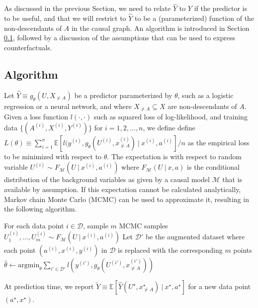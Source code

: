 
As discussed in the previous Section, we need to relate $\hat Y$ to
$Y$ if the predictor is to be useful, and that we will restrict to
$\hat Y$ to be a (parameterized) function of the non-descendants of
$A$ in the causal graph. An algorithm is introduced in Section
\ref{sec:algorithm}, followed by a discussion of the assumptions that
can be used to express counterfactuals.

\subsection{Algorithm}
\label{sec:algorithm}

Let $\hat Y \equiv g_\theta(U, X_{\nsucc A})$ be a predictor
parameterized by $\theta$, such as a logistic regression or a neural
network, and where $X_{\nsucc A} \subseteq X$ are non-descendants of
$A$. Given a loss function $l(\cdot, \cdot)$ such as squared loss of
log-likelihood, and training data $\{(A^{(i)}, X^{(i)}, Y^{(i)})\}$
for $i = 1, 2, \dots, n$, we define define $L(\theta) \equiv \sum_{i =
  1}^n \mathbb E[l(y^{(i)}, g_\theta(U^{(i)}, x^{(i)}_{\nsucc
    A})\ |\ x^{(i)}, a^{(i)}] / n$ as the empirical loss to be
minimized with respect to $\theta$.  The expectation is with respect
to random variable $U^{(i)} \sim F_{\mathcal M}(U\ |\ x^{(i)},
a^{(i)})$ where $F_{\mathcal M}(U\ |\ x, a)$ is the conditional
distribution of the background variables as given by a causal model
$\mathcal M$ that is available by assumption. If this expectation
cannot be calculated analytically, Markov chain Monte Carlo (MCMC) can
be used to approximate it, resulting in the following algorithm.
  
\begin{algorithmic}[1]
  \State For each data point $i \in \mathcal D$, sample $m$ MCMC samples
  $U_1^{(i)}, \dots, U_m^{(i)} \sim F_{\mathcal M}(U\ |\ x^{(i)},a^{(i)})$
  \State Let $\mathcal D'$ be the augmented dataset where each point
  $(a^{(i)}, x^{(i)}, y^{(i)})$  in $\mathcal D$ is replaced with the corresponding $m$ points
  \State $\hat \theta \leftarrow \mathrm{argmin}_\theta \sum_{i' \in \mathcal D'}
                                   l(y^{(i')}, g_\theta(U^{(i')}, x^{(i')}_{\nsucc A}))$
\EndProcedure
\end{algorithmic}

At prediction time, we report $\tilde Y \equiv \mathbb E[\hat Y(U^\star,
  x^\star_{\nsucc A})\ |\ x^\star, a^\star]$ for a new data point $(a^\star,
x^\star)$.

